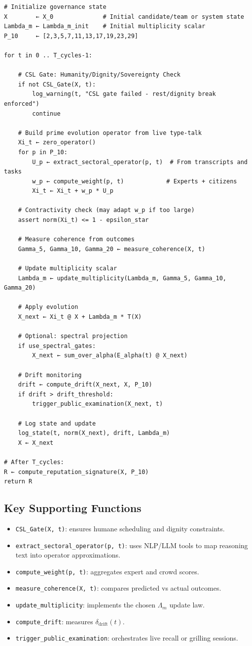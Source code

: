 \documentclass[11pt]{article}
\begin{document}
\begin{verbatim}
# Initialize governance state
X        ← X_0              # Initial candidate/team or system state
Lambda_m ← Lambda_m_init    # Initial multiplicity scalar
P_10     ← [2,3,5,7,11,13,17,19,23,29]

for t in 0 .. T_cycles-1:

    # CSL Gate: Humanity/Dignity/Sovereignty Check
    if not CSL_Gate(X, t):
        log_warning(t, "CSL gate failed - rest/dignity break enforced")
        continue

    # Build prime evolution operator from live type-talk
    Xi_t ← zero_operator()
    for p in P_10:
        U_p ← extract_sectoral_operator(p, t)  # From transcripts and tasks
        w_p ← compute_weight(p, t)            # Experts + citizens
        Xi_t ← Xi_t + w_p * U_p

    # Contractivity check (may adapt w_p if too large)
    assert norm(Xi_t) <= 1 - epsilon_star

    # Measure coherence from outcomes
    Gamma_5, Gamma_10, Gamma_20 ← measure_coherence(X, t)

    # Update multiplicity scalar
    Lambda_m ← update_multiplicity(Lambda_m, Gamma_5, Gamma_10, Gamma_20)

    # Apply evolution
    X_next ← Xi_t @ X + Lambda_m * T(X)

    # Optional: spectral projection
    if use_spectral_gates:
        X_next ← sum_over_alpha(E_alpha(t) @ X_next)

    # Drift monitoring
    drift ← compute_drift(X_next, X, P_10)
    if drift > drift_threshold:
        trigger_public_examination(X_next, t)

    # Log state and update
    log_state(t, norm(X_next), drift, Lambda_m)
    X ← X_next

# After T_cycles:
R ← compute_reputation_signature(X, P_10)
return R
\end{verbatim}

\subsection{Key Supporting Functions}

\begin{itemize}[leftmargin=1.5em]
    \item \texttt{CSL\_Gate(X, t)}: ensures humane scheduling and dignity constraints.
    \item \texttt{extract\_sectoral\_operator(p, t)}: uses NLP/LLM tools to map reasoning text into operator approximations.
    \item \texttt{compute\_weight(p, t)}: aggregates expert and crowd scores.
    \item \texttt{measure\_coherence(X, t)}: compares predicted vs actual outcomes.
    \item \texttt{update\_multiplicity}: implements the chosen \(\Lambda_m\) update law.
    \item \texttt{compute\_drift}: measures \(\delta_{\text{drift}}(t)\).
    \item \texttt{trigger\_public\_examination}: orchestrates live recall or grilling sessions.
\end{itemize}
\end{document}

